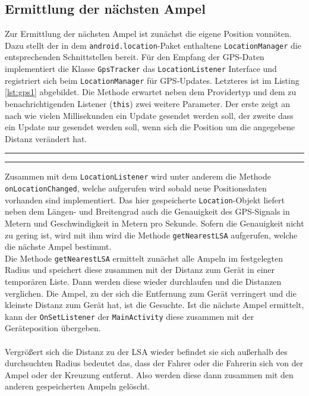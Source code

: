 \subsection{Ermittlung der nächsten Ampel}
Zur Ermittlung der nächsten Ampel ist zunächst die eigene Position vonnöten. Dazu stellt der in dem \texttt{android.location}-Paket enthaltene \texttt{LocationManager} die entsprechenden Schnittstellen bereit. Für den Empfang der \gls{GPS}-Daten implementiert die Klasse \texttt{GpsTracker} das \texttt{LocationListener} Interface und registriert sich beim \texttt{LocationManager} für \gls{GPS}-Updates.
Letzteres ist im Listing \ref{lst:gps1} abgebildet. Die Methode erwartet neben dem Providertyp und dem zu benachrichtigenden Listener (\texttt{this}) zwei weitere Parameter. Der erste zeigt an nach wie vielen Millisekunden ein Update gesendet werden soll, der zweite dass ein Update nur gesendet werden soll, wenn sich die Position um die angegebene Distanz verändert hat.
\begin{center}
\rule{35em}{0.5pt}

\rule{35em}{0.5pt}
\end{center}
Zusammen mit dem \texttt{LocationListener} wird unter anderem die Methode \texttt{onLocationChanged}, welche aufgerufen wird sobald neue Positionsdaten vorhanden sind implementiert. Das hier gespeicherte \texttt{Location}-Objekt liefert neben dem Längen- und Breitengrad auch die Genauigkeit des \gls{GPS}-Signals in Metern und Geschwindigkeit in Metern pro Sekunde. Sofern die Genauigkeit nicht zu gering ist, wird mit ihm wird die Methode \texttt{getNearestLSA} aufgerufen, welche die nächste Ampel bestimmt.\\
Die Methode \texttt{getNearestLSA} ermittelt zunächst alle Ampeln im festgelegten Radius und speichert diese zusammen mit der Distanz zum Gerät in einer temporären Liste. Dann werden diese wieder durchlaufen und die Distanzen verglichen. Die Ampel, zu der sich die Entfernung zum Gerät verringert und die kleinste Distanz zum Gerät hat, ist die Gesuchte. Ist die nächste Ampel ermittelt, kann der \texttt{OnSetListener} der \texttt{MainActivity} diese zusammen mit der Geräteposition übergeben. \\\\
Vergrößert sich die Distanz zu der \gls{LSA} wieder befindet sie sich außerhalb des durchsuchten Radius bedeutet das, dass der Fahrer oder die Fahrerin sich von der Ampel oder der Kreuzung entfernt. Also werden diese dann zusammen mit den anderen gespeicherten Ampeln gelöscht. 
\clearpage
\begin{center}

\end{center}
%
%
